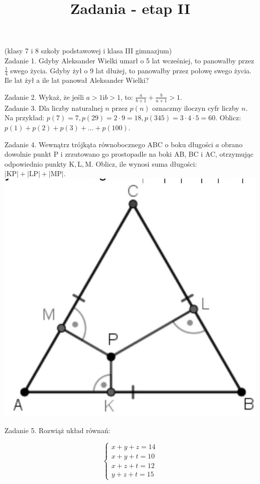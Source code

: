 \documentclass[10pt]{article}
\title{Zadania - etap II }
\author{}
\date{}
\begin{document}
\maketitle
(klasy 7 i 8 szkoły podstawowej i klasa III gimnazjum)\\
Zadanie 1. Gdyby Aleksander Wielki umarł o 5 lat wcześniej, to panowałby przez \(\frac{1}{4}\) swego życia. Gdyby żył o 9 lat dłużej, to panowałby przez połowę swego życia. Ile lat żył a ile lat panował Aleksander Wielki?

Zadanie 2. Wykaż, że jeśli \(a>1 \mathrm{i} b>1\), to: \(\frac{a}{b+1}+\frac{b}{a+1}>1\).\\
Zadanie 3. Dla liczby naturalnej \(n\) przez \(p(n)\) oznaczmy iloczyn cyfr liczby \(n\). Na przykład: \(p(7)=7, p(29)=2 \cdot 9=18, p(345)=3 \cdot 4 \cdot 5=60\). Oblicz: \(p(1)+p(2)+p(3)+\ldots+p(100)\).

Zadanie 4. Wewnątrz trójkąta równobocznego ABC o boku długości \(a\) obrano dowolnie punkt P i zrzutowano go prostopadle na boki AB, BC i AC, otrzymując odpowiednio punkty \(\mathrm{K}, \mathrm{L}, \mathrm{M}\). Oblicz, ile wynosi suma długości: \(|\mathrm{KP}|+|\mathrm{LP}|+|\mathrm{MP}|\).\\
\includegraphics[max width=\textwidth, center]{2024_11_21_0d37590029f311fe3dcdg-1}

Zadanie 5. Rozwiąż układ równań:

\[
\left\{\begin{array}{l}
x+y+z=14 \\
x+y+t=10 \\
x+z+t=12 \\
y+z+t=15
\end{array}\right.
\]
\end{document}
